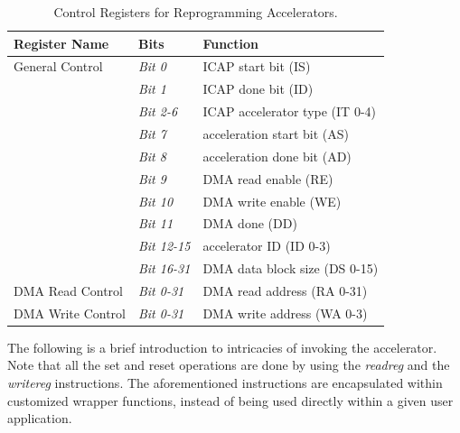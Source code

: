 \begin{table}[ht]
\scriptsize
\begin{center}
\begin{tabular}{|l|l|l|}
\hline 
\textbf{Register Name} & \textbf{Bits} & \textbf{Function}\\ 
\hline 
\hline
General Control &{\em Bit 0}   & ICAP start bit (IS)\\ 
\hline 
 &{\em Bit 1}   &  ICAP done bit (ID)\\ 
\hline 
 &{\em Bit 2-6} & ICAP accelerator type (IT 0-4)\\ 
\hline 
 &{\em Bit 7}   & acceleration start bit (AS)\\ 
\hline 
 &{\em Bit 8}   & acceleration done bit (AD)\\ 
\hline 
 &{\em Bit 9}   & DMA read enable (RE)\\ 
\hline 
 &{\em Bit 10}  & DMA write enable (WE)\\ 
\hline 
 &{\em Bit 11}  & DMA done (DD)\\
\hline
 &{\em Bit 12-15} & accelerator ID (ID 0-3)\\
\hline
 &{\em Bit 16-31} & DMA data block size (DS 0-15)\\
\hline
DMA Read Control &{\em Bit 0-31}  & DMA read address (RA 0-31)\\
\hline
DMA Write Control &{\em Bit 0-31} & DMA write address (WA 0-3)\\
\hline
\end{tabular} 
\caption{Control Registers for Reprogramming Accelerators.}
\label{tbl_AccReg}
\end{center}
\end{table}

The following is a brief introduction to intricacies of invoking the accelerator. 
Note that all the set and reset operations are done by using the
{\em readreg} and the {\em writereg} instructions. The aforementioned instructions are
encapsulated within customized wrapper functions, instead of being
used directly within a given user application.

